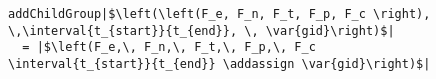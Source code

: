 
\begin{figure}[ht]
  \begin{verbatim}
addChildGroup|$\left(\left(F_e, F_n, F_t, F_p, F_c \right), \,\interval{t_{start}}{t_{end}}, \, \var{gid}\right)$|
  = |$\left(F_e,\, F_n,\, F_t,\, F_p,\, F_c \interval{t_{start}}{t_{end}} \addassign \var{gid}\right)$|
  \end{verbatim}
  \caption{\label{fun:add-child-group}}
\end{figure}

